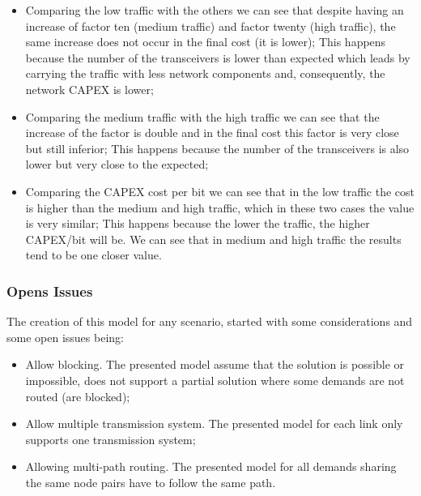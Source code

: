 \begin{itemize}
  \item Comparing the low traffic with the others we can see that despite having an increase of factor ten (medium traffic) and factor twenty (high traffic), the same increase does not occur in the final cost (it is lower);
  \subitem This happens because the number of the transceivers is lower than expected which leads by carrying the traffic with less network components and, consequently, the network CAPEX is lower;
  \item Comparing the medium traffic with the high traffic we can see that the increase of the factor is double and in the final cost this factor is very close but still inferior;
  \subitem This happens because the number of the transceivers is also lower but very close to the expected;
  \item Comparing the CAPEX cost per bit we can see that in the low traffic the cost is higher than the medium and high traffic, which in these two cases the value is very similar;
  \subitem This happens because the lower the traffic, the higher CAPEX/bit will be. We can see that in medium and high traffic the results tend to be one closer value.
\end{itemize}

\vspace{13pt}

\subsubsection{Opens Issues}

The creation of this model for any scenario, started with some considerations and some open issues being:

\begin{itemize}
  \item Allow blocking.
  \subitem The presented model assume that the solution is possible or impossible, does not support a partial solution where some demands are not routed (are blocked);
  \item Allow multiple transmission system.
  \subitem The presented model for each link only supports one transmission system;
  \item Allowing multi-path routing.
  \subitem The presented model for all demands sharing the same node pairs have to follow the same path.
\end{itemize} 

\newpage
\vspace{11pt}

